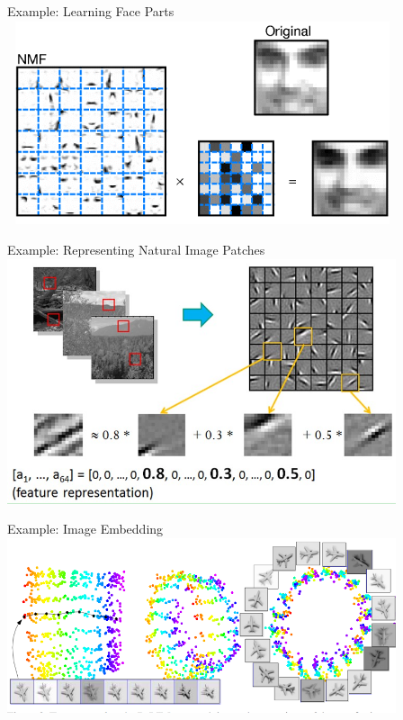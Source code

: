 \documentclass[serif,xcolor=pdftex,dvipsnames,table,hyperref={bookmarks=false,breaklinks}]{beamer}
\begin{document}
\begin{frame}[t]{Example: Learning Face Parts}
\center
\includegraphics[width=4.5in]{../Figures/nmf.png}
\end{frame}

\begin{frame}[t]{Example: Representing Natural Image Patches}
\center
\includegraphics[width=4.5in]{../Figures/sparse_coding_images.jpg}
\end{frame}

\begin{frame}[t]{Example: Image Embedding}
\center
\includegraphics[width=4.5in]{../Figures/image_embedding.png}
\end{frame}
\end{document}
